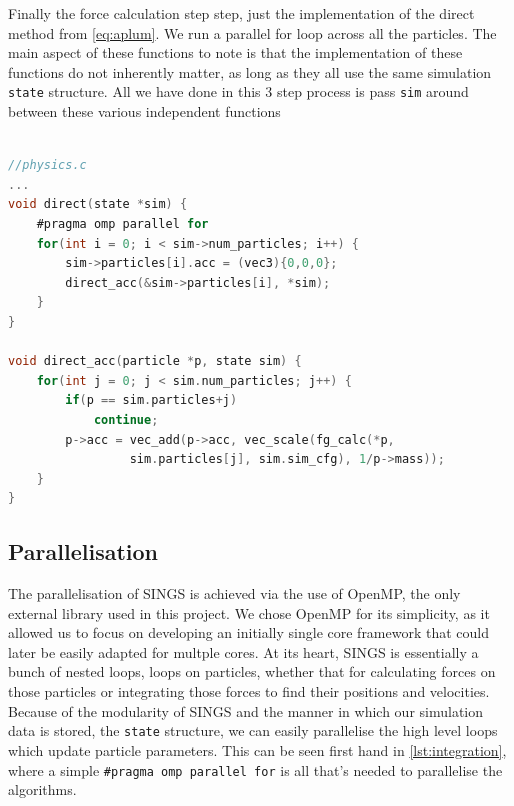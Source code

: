 \documentclass[12pt, twoside, letterpaper]{article}
\begin{document}
\normalsize
Finally the force calculation step step, just the implementation of the direct method from \eqref{eq:aplum}. We run a parallel for loop across all the particles. The main aspect of these functions to note is that the implementation of these functions do not inherently matter, as long as they all use the same simulation \verb+state+ structure. All we have done in this 3 step process is pass \verb+sim+ around between these various independent functions

\scriptsize
\begin{minipage}{\linewidth}
\begin{lstlisting}[language=C, label={lst:physics}, frame=single]

//physics.c
...
void direct(state *sim) {
    #pragma omp parallel for
    for(int i = 0; i < sim->num_particles; i++) {
        sim->particles[i].acc = (vec3){0,0,0};
        direct_acc(&sim->particles[i], *sim);
    }
}

void direct_acc(particle *p, state sim) {
    for(int j = 0; j < sim.num_particles; j++) {
        if(p == sim.particles+j)
            continue;
        p->acc = vec_add(p->acc, vec_scale(fg_calc(*p, 
        		 sim.particles[j], sim.sim_cfg), 1/p->mass));
    }
}

\end{lstlisting}
\end{minipage}

\normalsize

\subsection{Parallelisation} \label{subsec:parallelisation}
The parallelisation of SINGS is achieved via the use of OpenMP, the only external library used in this project. We chose OpenMP for its simplicity, as it allowed us to focus on developing an initially single core framework that could later be easily adapted for multple cores. At its heart, SINGS is essentially a bunch of nested loops, loops on particles, whether that for calculating forces on those particles or integrating those forces to find their positions and velocities. Because of the modularity of SINGS and the manner in which our simulation data is stored, the \verb+state+ structure, we can easily parallelise the high level loops which update particle parameters. This can be seen first hand in \ref{lst:integration}, where a simple \verb+#pragma omp parallel for+ is all that's needed to parallelise the algorithms.
\end{document}
